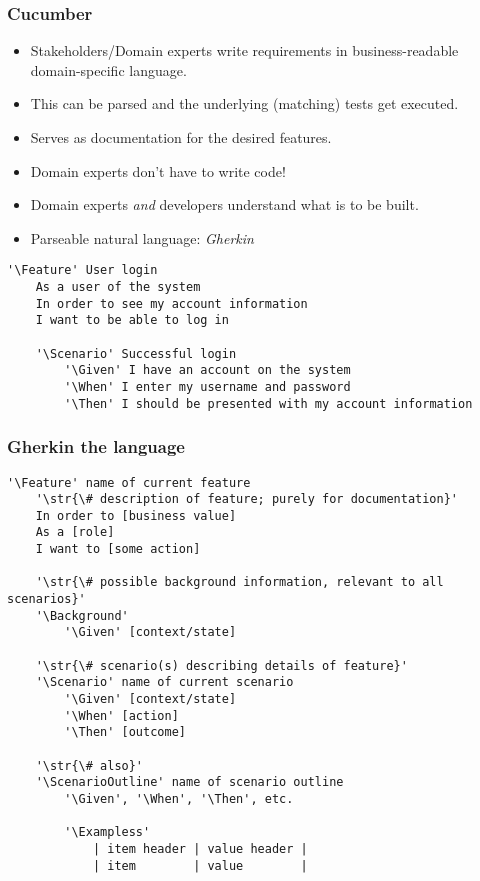 \documentclass[10pt]{vcs_beamer}
\newcommand{\str}[1]{\color{Turquoise}{#1}}
\newcommand{\Feature}{\color{BlueViolet}{Feature:}}
\newcommand{\Background}{\color{BlueViolet}{Background:}}
\newcommand{\Scenario}{\color{BlueViolet}{Scenario:}}
\newcommand{\ScenarioOutline}{\color{BlueViolet}{Scenario Outline:}}
\newcommand{\Exampless}{\color{BlueViolet}{Examples:}}
\newcommand{\Given}{\color{DarkOrange}{Given}}
\newcommand{\When}{\color{RoyalBlue}{When}}
\newcommand{\Then}{\color{ForestGreen}{Then}}
\begin{document}
\begin{frame}[fragile]
    \frametitle{Cucumber}

\begin{itemize}
    \item Stakeholders/Domain experts write requirements in business-readable
        domain-specific language.
    \item This can be parsed and the underlying (matching) tests get executed.
    \item Serves as documentation for the desired features.
    \item Domain experts don't have to write code!
    \item Domain experts \emph{and} developers understand what is to be built.
    \item Parseable natural language: \emph{Gherkin}
\end{itemize}

\begin{lstlisting}[escapeinside='']
'\Feature' User login
    As a user of the system
    In order to see my account information
    I want to be able to log in

    '\Scenario' Successful login
        '\Given' I have an account on the system
        '\When' I enter my username and password
        '\Then' I should be presented with my account information
\end{lstlisting}
\end{frame}

\begin{frame}[fragile]
\frametitle{Gherkin the language}

\begin{lstlisting}[escapeinside='']
'\Feature' name of current feature
    '\str{\# description of feature; purely for documentation}'
    In order to [business value]
    As a [role]
    I want to [some action]

    '\str{\# possible background information, relevant to all scenarios}'
    '\Background'
        '\Given' [context/state]

    '\str{\# scenario(s) describing details of feature}'
    '\Scenario' name of current scenario
        '\Given' [context/state]
        '\When' [action]
        '\Then' [outcome]

    '\str{\# also}'
    '\ScenarioOutline' name of scenario outline
        '\Given', '\When', '\Then', etc.

        '\Exampless'
            | item header | value header |
            | item        | value        |
\end{lstlisting}
\end{frame}
\end{document}
